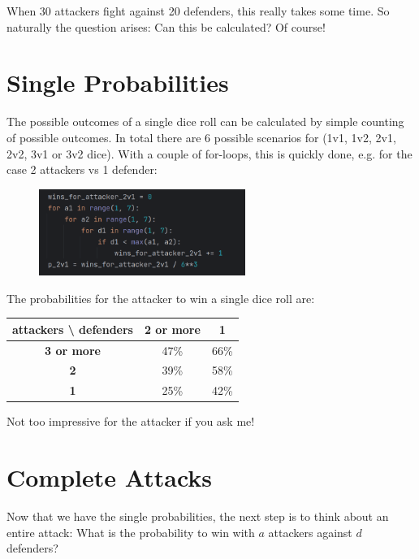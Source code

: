 \documentclass[11pt,a4paper]{article}
\begin{document}
    When 30 attackers fight against 20 defenders, this really takes some time.
    So naturally the question arises: Can this be calculated? Of course!


    \section{Single Probabilities}
    The possible outcomes of a single dice roll can be calculated by simple counting of possible outcomes.
    In total there are 6 possible scenarios for (1v1, 1v2, 2v1, 2v2, 3v1 or 3v2 dice).
    With a couple of for-loops, this is quickly done, e.g. for the case 2 attackers vs 1 defender:

    \begin{figure}[H]
        \centering
        \includegraphics[width=0.6\textwidth]{../images/2v1.png}
    \end{figure}

    The probabilities for the attacker to win a single dice roll are:

    \begin{table}[H]
        \centering
        \begin{tabular}{|c|c|c|}
            \hline
            \textbf{attackers \textbackslash\; defenders} & \textbf{2 or more} & \textbf{1} \\
            \hline
            \textbf{3 or more}                            & 47\%               & 66\%       \\
            \hline
            \textbf{2}                                    & 39\%               & 58\%       \\
            \hline
            \textbf{1}                                    & 25\%               & 42\%       \\
            \hline
        \end{tabular}
    \end{table}

    Not too impressive for the attacker if you ask me!


    \section{Complete Attacks}
    Now that we have the single probabilities, the next step is to think about an entire attack: What is the probability to win with $a$ attackers against $d$ defenders?
\end{document}

